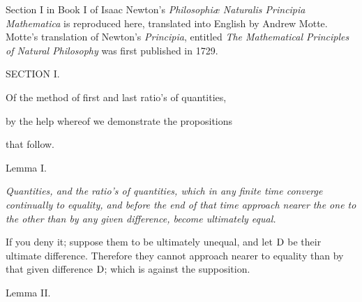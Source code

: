 Section I in Book I of Isaac Newton's
{\it Philosophi{\ae} Naturalis Principia Mathematica\/}
is reproduced here, translated into English by Andrew Motte.
Motte's translation of Newton's {\it Principia}, entitled
{\it The Mathematical Principles of Natural Philosophy\/}
was first published in 1729.

\bigbreak\bigskip


\vskip3pt


\vfill\eject


\null\vskip36pt

\centerline{\largerm SECTION I.}

\vskip 12pt

\centerline{\largeit Of the method of first and last ratio's of quantities,}

\vskip3pt

\centerline{\largeit by the help whereof we demonstrate the propositions}

\vskip3pt

\centerline{\largeit that follow.}

\nobreak\bigskip

\centerline{\largesc Lemma I.}

\nobreak\bigskip

{\it
Quantities, and the ratio's of quantities, which in any finite
time converge continually to equality, and before the end of that
time approach nearer the one to the other than by any given
difference, become ultimately equal.}

\bigbreak

If you deny it; suppose them to be ultimately unequal, and let
${\rm D}$ be their ultimate difference.  Therefore they cannot
approach nearer to equality than by that given difference
${\rm D}$; which is against the supposition.

\bigbreak

\centerline{\largesc Lemma II.}

\nobreak\bigskip

